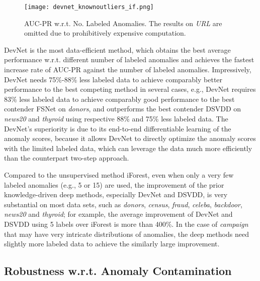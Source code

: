 \documentclass[sigconf]{acmart}
\begin{document}
\begin{figure}[h!]
  \centering
    \texttt{[image: devnet\_knownoutliers\_if.png]}
  \caption{AUC-PR w.r.t. No. Labeled Anomalies. The results on \textit{URL} are omitted due to prohibitively expensive computation.}
  \label{fig:knownouliers}
\end{figure}

DevNet is the most data-efficient method, which obtains the best average performance w.r.t. different number of labeled anomalies and achieves the fastest increase rate of AUC-PR against the number of labeled anomalies. Impressively, DevNet needs 75\%-88\% less labeled data to achieve comparably better performance to the best competing method in several cases, e.g., DevNet requires 83\% less labeled data to achieve comparably good performance to the best contender FSNet on \textit{donors}, and outperforms the best contender DSVDD on \textit{news20} and \textit{thyroid} using respective 88\% and 75\% less labeled data. The DevNet's superiority is due to its end-to-end differentiable learning of the anomaly scores, because it allows DevNet to directly optimize the anomaly scores with the limited labeled data, which can leverage the data much more efficiently than the counterpart two-step approach.

Compared to the unsupervised method iForest, even when only a very few labeled anomalies (e.g., 5 or 15) are used, the improvement of the prior knowledge-driven deep methods, especially DevNet and DSVDD, is very substantial on most data sets, such as \textit{donors}, \textit{census}, \textit{fraud}, \textit{celeba}, \textit{backdoor}, \textit{news20} and \textit{thyroid}; for example, the average improvement of DevNet and DSVDD using 5 labels over iForest is more than 400\%. In the case of \textit{campaign} that may have very intricate distributions of anomalies, the deep methods need slightly more labeled data to achieve the similarly large improvement.


\subsection{Robustness w.r.t. Anomaly Contamination}\label{exp:contamination}
\end{document}
